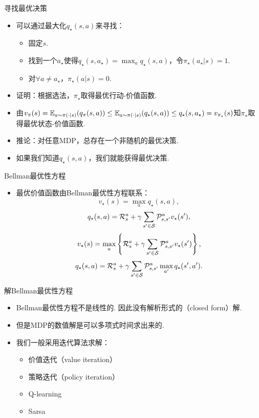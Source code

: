 {寻找最优决策}
\begin{itemize}
    \item 可以通过最大化$q_\star(s,a)$来寻找：
    \begin{itemize}
        \item 固定$s$.
        \item 找到一个$a_\star$使得$q_\star(s,a_\star)=\max_{a}q_\star(s,a)$，令$\pi_\star(a_\star|s)=1$.
        \item 对$\forall a\neq a_\star$，$\pi_\star(a|s)=0$.
    \end{itemize}
    \item 证明：根据选法，$\pi_\star$取得最优行动-价值函数.
    \item 由$v_\pi(s) = \mathbb{E}_{a\sim\pi(\cdot|s)}(q_\pi(s,a))\leq \mathbb{E}_{a\sim\pi(\cdot|s)}(q_\star(s,a))\leq q_\star(s,a_\star)=v_{\pi_\star}(s)$知$\pi_\star$取得最优状态-价值函数.
    \item 推论：对任意MDP，总存在一个非随机的最优决策.
    \item 如果我们知道$q_\star(s,a)$，我们就能获得最优决策. %
\end{itemize}


{Bellman最优性方程}
\begin{itemize}
    \item 最优价值函数由Bellman最优性方程联系：
\[v_\star(s) = \max_a q_\star(s,a),\]
\[q_\star(s,a) = \mathcal R_s^a + \gamma \sum_{s'\in \mathcal S}\mathcal P_{s,s'}^av_\star(s'),\]
\[v_\star(s) = \max_a\left\{\mathcal R_s^a + \gamma \sum_{s'\in \mathcal S}\mathcal P_{s,s'}^av_\star(s')\right\},\]
\[q_\star(s,a) = \mathcal R_s^a+\gamma \sum_{s'\in \mathcal S}\mathcal P_{s,s'}^a\max_{a'}q_\star(s',a').\]
\end{itemize}


{解Bellman最优性方程}
    \begin{itemize}
        \item Bellman最优性方程不是线性的. 因此没有解析形式的（closed form）解.
        \item 但是MDP的数值解是可以多项式时间求出来的.
        \item 我们一般采用迭代算法求解：
        \begin{itemize}
            \item 价值迭代（value iteration）
            \item 策略迭代（policy iteration）
            \item Q-learning
            \item Sarsa
        \end{itemize}
    \end{itemize}

